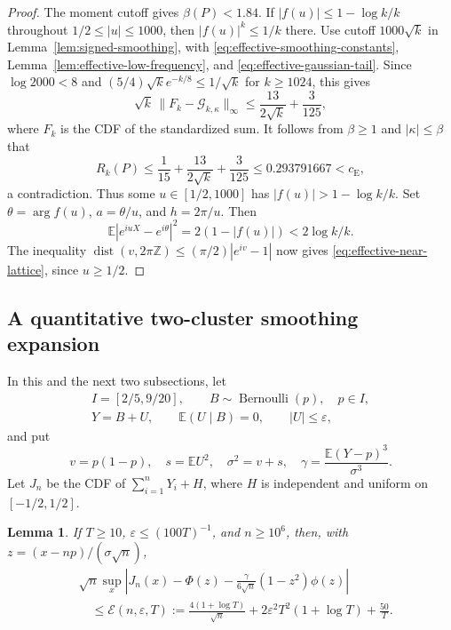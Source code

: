 \documentclass[aop]{imsart}
\theoremstyle{plain}
\newtheorem{lemma}[theorem]{Lemma}
\theoremstyle{definition}
\theoremstyle{definition}
\newcommand{\EE}{\mathbb E}
\newcommand{\ce}{c_{\mathrm E}}
\DeclareMathOperator{\dist}{dist}
\begin{document}
\begin{proof}
The moment cutoff gives $\beta(P)<1.84$.  If
$|f(u)|\le1-\log k/k$ throughout $1/2\le|u|\le1000$, then
$|f(u)|^k\le1/k$ there.  Use cutoff $1000\sqrt k$ in
Lemma~\ref{lem:signed-smoothing}, with
\eqref{eq:effective-smoothing-constants},
Lemma~\ref{lem:effective-low-frequency}, and
\eqref{eq:effective-gaussian-tail}.  Since $\log2000<8$ and
$(5/4)\sqrt k e^{-k/8}\le1/\sqrt k$ for $k\ge1024$, this gives
\[
 \sqrt k\,\|F_k-\mathcal G_{k,\kappa}\|_\infty
 \le\frac{13}{2\sqrt k}+\frac3{125},
\]
where $F_k$ is the CDF of the standardized sum.
It follows from $\beta\ge1$ and $|\kappa|\le\beta$ that
\[
 R_k(P)\le\frac1{15}+\frac{13}{2\sqrt k}+\frac3{125}
 \le0.293791667<\ce,
\]
a contradiction.  Thus some $u\in[1/2,1000]$ has
$|f(u)|>1-\log k/k$.
Set $\theta=\arg f(u)$, $a=\theta/u$, and $h=2\pi/u$.  Then
\[
 \EE|e^{iuX}-e^{i\theta}|^2=2(1-|f(u)|)<2\log k/k.
\]
The inequality
$\dist(v,2\pi\mathbb Z)\le(\pi/2)|e^{iv}-1|$ now gives
\eqref{eq:effective-near-lattice}, since $u\ge1/2$.
\end{proof}

\subsection{A quantitative two-cluster smoothing expansion}

In this and the next two subsections, let
\[
\begin{gathered}
 I=[2/5,9/20],\qquad
 B\sim\operatorname{Bernoulli}(p),\quad p\in I,\\
 Y=B+U,\qquad \EE(U\mid B)=0,\qquad |U|\le\varepsilon,
\end{gathered}
\]
and put
\[
 v=p(1-p),\quad s=\EE U^2,\quad \sigma^2=v+s,\quad
 \gamma=\frac{\EE(Y-p)^3}{\sigma^3}.
\]
Let $J_n$ be the CDF of $\sum_{i=1}^nY_i+H$, where $H$ is
independent and uniform on $[-1/2,1/2]$.

\begin{lemma}\label{lem:effective-cluster-jitter}
If $T\ge10$, $\varepsilon\le(100T)^{-1}$, and $n\ge10^6$, then,
with $z=(x-np)/(\sigma\sqrt n)$,
\begin{equation}\label{eq:effective-cluster-jitter}
\begin{split}
 &\sqrt n\sup_x\left|
 J_n(x)-\Phi(z)-\frac{\gamma}{6\sqrt n}(1-z^2)\phi(z)
 \right|\\
 &\quad\le
 \mathcal E(n,\varepsilon,T):=
 \frac{4(1+\log T)}{\sqrt n}
 +2\varepsilon^2T^2(1+\log T)+\frac{50}{T}.
\end{split}
\end{equation}
\end{lemma}
\end{document}
